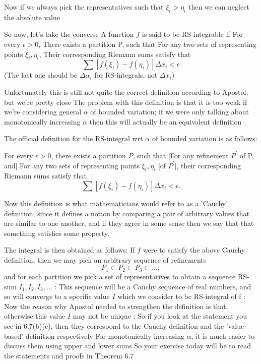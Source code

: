 Now if we always pick the representatives such that $\xi_i>\eta_i$ then we can neglect the absolute value

So now, let's take the converse
A function $f$ is said to be RS-integrable if
For every $\epsilon>0$,
There exists a partition P, such that
For any two sets of representing points $\xi_i,\eta_i$,
Their corresponding Riemann sums satisfy that
\[ \sum[f(\xi_i)-f(\eta_i)]\Delta x_i<\epsilon \]
(The last one should be $\Delta \alpha_i$ for RS-integrals, not $\Delta x_i$)

Unfortunately this is still not quite the correct definition according to Apostol, but we're pretty close
The problem with this definition is that it is too weak if we're considering general $\alpha$ of bounded variation; if we were only talking about monotonically increasing $\alpha$ then this will actually be an equivalent definition

The official definition for the RS-integral wrt $\alpha$ of bounded variation is as follows:
\begin{definition}
For every $\epsilon>0$, there exists a partition $P$, such that
[For any refinement $P^\prime$ of P, and]
For any two sets of representing points $\xi_i,\eta_i$ [of $P^\prime$], their corresponding Riemann sums satisfy that
\[ \sum[f(\xi_i)-f(\eta_i)]\Delta x_i<\epsilon. \]
\end{definition}

Now this definition is what mathematicians would refer to as a 'Cauchy' definition, since it defines a notion by comparing a pair of arbitrary values that are similar to one another, and if they agree in some sense then we say that that something satisfies some property.

The integral is then obtained as follows: If $f$ were to satisfy the above Cauchy definition, then we may pick an arbitrary sequence of refinements
\[ P_1 \subset P_2 \subset P_3 \subset ...; \]
and for each partition we pick a set of representatives to obtain a sequence RS-sum
$I_1, I_2, I_3, ...$
:
This sequence will be a Cauchy sequence of real numbers, and so will converge to a specific value $I$ which we consider to be RS-integral of f
:
Now the reason why Apostol needed to strengthen the definition is that, otherwise this value $I$ may not be unique
:
So if you look at the statement you see in 6.7(b)(c), then they correspond to the Cauchy definition and the 'value-based' definition respectively
For monotonically increasing $\alpha$, it is much easier to discuss them using upper and lower sums
So your exercise today will be to read the statements and proofs in Theorem 6.7

